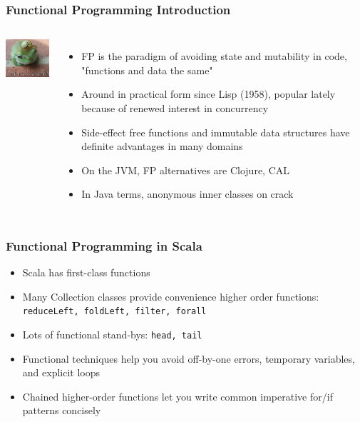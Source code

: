 \begin{frame} 
\frametitle{Functional Programming Introduction}
\begin{columns}[c]
  \column{0.5in}
    \includegraphics[width=1.0in]{graphics/hat.png} 
  \column{2.5in}
    \begin{itemize}
      \item<1-> FP is the paradigm of avoiding state and mutability in code, "functions and data the same"
      \item<2-> Around in practical form since Lisp (1958), popular lately because of renewed interest in concurrency
      \item<3-> Side-effect free functions and immutable data structures have definite advantages in many domains
      \item<4-> On the JVM, FP alternatives are Clojure, CAL
      \item<5-> In Java terms, anonymous inner classes on crack
    \end{itemize}
\end{columns}
\end{frame} 

\begin{frame} 
\frametitle{Functional Programming in Scala}
\begin{itemize}
  \item<1-> Scala has first-class functions
  \item<2-> Many Collection classes provide convenience higher order functions: \tt\small{reduceLeft, foldLeft, filter, forall}
  \item<3-> Lots of functional stand-bys: \tt\small{head, tail}
  \item<4-> Functional techniques help you avoid off-by-one errors, temporary variables, and explicit loops
  \item<5-> Chained higher-order functions let you write common imperative for/if patterns concisely
\end{itemize}
\end{frame} 

